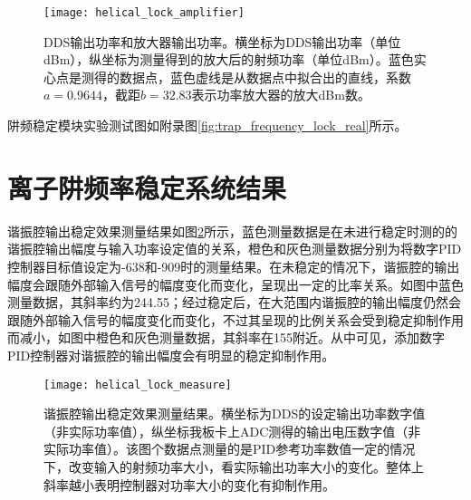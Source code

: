 \begin{figure}
    \centering
    \caption[DDS输出功率和放大器输出功率]{DDS输出功率和放大器输出功率。横坐标为DDS输出功率（单位dBm），纵坐标为测量得到的放大后的射频功率（单位dBm）。蓝色实心点是测得的数据点，蓝色虚线是从数据点中拟合出的直线，系数$a=0.9644$，截距$b=32.83$表示功率放大器的放大dBm数。\label{fig:helical_lock_amplifier}}
    \texttt{[image: helical\_lock\_amplifier]}
\end{figure}

阱频稳定模块实验测试图如附录图\ref{fig:trap_frequency_lock_real}所示。

\section[离子阱频率稳定系统结果]{离子阱频率稳定系统结果}

谐振腔输出稳定效果测量结果如图\ref{fig:helical_lock_measure}所示，蓝色测量数据是在未进行稳定时测的的谐振腔输出幅度与输入功率设定值的关系，橙色和灰色测量数据分别为将数字PID控制器目标值设定为-638和-909时的测量结果。在未稳定的情况下，谐振腔的输出幅度会跟随外部输入信号的幅度变化而变化，呈现出一定的比率关系。如图中蓝色测量数据，其斜率约为244.55；经过稳定后，在大范围内谐振腔的输出幅度仍然会跟随外部输入信号的幅度变化而变化，不过其呈现的比例关系会受到稳定抑制作用而减小，如图中橙色和灰色测量数据，其斜率在155附近。从中可见，添加数字PID控制器对谐振腔的输出幅度会有明显的稳定抑制作用。

\begin{figure}
    \centering
    \caption[谐振腔输出稳定效果测量结果]{谐振腔输出稳定效果测量结果。横坐标为DDS的设定输出功率数字值（非实际功率值），纵坐标我板卡上ADC测得的输出电压数字值（非实际功率值）。该图个数据点测量的是PID参考功率数值一定的情况下，改变输入的射频功率大小，看实际输出功率大小的变化。整体上斜率越小表明控制器对功率大小的变化有抑制作用。\label{fig:helical_lock_measure}}
    \texttt{[image: helical\_lock\_measure]}
\end{figure}


